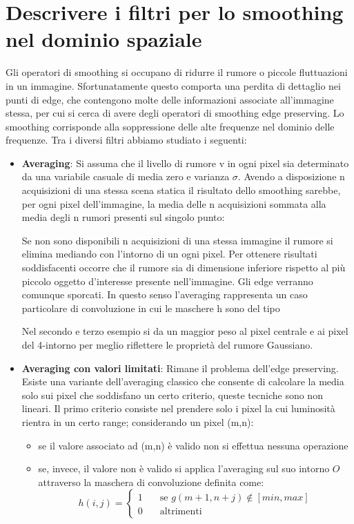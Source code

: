\section{Descrivere i filtri per lo smoothing nel dominio spaziale}
Gli operatori di smoothing si occupano di ridurre il rumore o piccole fluttuazioni in un immagine. Sfortunatamente questo comporta una perdita di dettaglio nei punti di edge, che contengono molte delle informazioni associate all'immagine stessa, per cui si cerca di avere degli operatori di smoothing edge preserving. Lo smoothing corrisponde alla soppressione delle alte frequenze nel dominio delle frequenze. Tra i diversi filtri abbiamo studiato i seguenti:
\begin{itemize}
	\item \textbf{Averaging}: Si assuma che il livello di rumore v in ogni pixel sia determinato da una variabile casuale di media zero e varianza $\sigma$. Avendo a disposizione n acquisizioni di una stessa scena statica il risultato dello smoothing sarebbe, per ogni pixel dell'immagine, la media delle n acquisizioni sommata alla media degli n rumori presenti sul singolo punto:
	
	Se non sono disponibili n acquisizioni di una stessa immagine il rumore si elimina mediando con l'intorno di un ogni pixel. Per ottenere risultati soddisfacenti occorre che il rumore sia di dimensione inferiore rispetto al più piccolo oggetto d'interesse presente nell'immagine. Gli edge verranno comunque sporcati. In questo senso l'averaging rappresenta un caso particolare di convoluzione in cui le maschere h sono del tipo
	
	Nel secondo e terzo esempio si da un maggior peso al pixel centrale e ai pixel del 4-intorno per meglio riflettere le proprietà del rumore Gaussiano.
	
	\item \textbf{Averaging con valori limitati}: Rimane il problema dell'edge preserving. Esiste una variante dell'averaging classico che consente di calcolare la media solo sui pixel che soddisfano un certo criterio, queste tecniche sono non lineari. Il primo criterio consiste nel	prendere solo i pixel la cui luminosità rientra in un certo range; considerando un pixel (m,n):
	\begin{itemize}
		\item se il valore associato ad (m,n) è valido non si effettua nessuna operazione
		\item se, invece, il valore non è valido si applica l'averaging sul suo intorno $O$ attraverso la maschera di convoluzione definita come:
		$$
		h(i,j) =
		\begin{cases}
		1 & \quad \text{se } g(m + 1, n + j) \notin [min, max]\\
		0 & \quad \text{altrimenti }
		\end{cases}
		$$
	\end{itemize}
	

\end{itemize}

